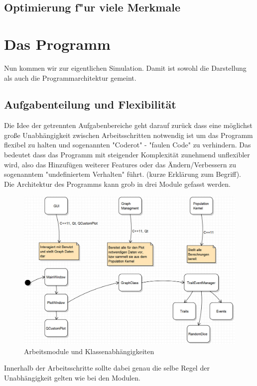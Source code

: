 \documentclass[11pt, a4paper, german]{article}
\begin{document}
	\subsection{Optimierung f"ur viele Merkmale}
	
\clearpage

\section{Das Programm}

Nun kommen wir zur eigentlichen Simulation. Damit ist sowohl die Darstellung als auch die Programmarchitektur gemeint. 
	\subsection{Aufgabenteilung und Flexibilität}
	Die Idee der getrennten Aufgabenbereiche geht darauf zurück dass eine möglichst große Unabhängigkeit zwischen Arbeitsschritten notwendig ist um das Programm flexibel zu halten und sogenannten "{}Coderot"{} - "{}faulen Code"{} zu verhindern. Das bedeutet dass das Programm mit steigender Komplexität zunehmend unflexibler wird, also das Hinzufügen weiterer Features oder das Ändern/Verbessern zu sogenanntem "{}undefiniertem Verhalten"{} führt. (kurze Erklärung zum Begriff).\\
	Die Architektur des Programms kann grob in drei Module gefasst werden. 
	\begin{figure}[H]
		\centering
		\includegraphics[width=0.7\linewidth]{./Pictures/Bild_Module}
		\caption[Module]{Arbeitsmodule und Klassenabhängigkeiten}
		\label{Module und Klassen}
	\end{figure}
	Innerhalb der Arbeitsschritte sollte dabei genau die selbe Regel der Unabhängigkeit gelten wie bei den Modulen.
	
\end{document}
